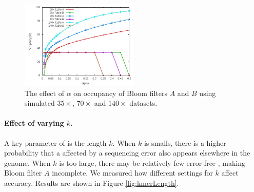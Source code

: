 \documentclass[10pt]{article}
\begin{document}

\begin{figure}[h!]
\begin{center}
\includegraphics[width=0.5\textwidth]{bloom_occupancy_alpha.jpg}
\caption{The effect of $\alpha$ on occupancy of Bloom filters $A$ and $B$ using simulated $35\times$, $70\times$ and $140\times$ datasets.\label{fig:bloom_occupancy_alpha}}
\end{center}
\end{figure}

\paragraph{Effect of varying $k$.}  
A key parameter of \tool is the \kmer length $k$.  When $k$ is smalls, there is a higher probability that a \kmer affected by a sequencing error also appears elsewhere in the genome.  When $k$ is too large, there may be relatively few error-free \kmers, making Bloom filter $A$ incomplete.  We measured how different settings for $k$ affect accuracy.  Results are shown in Figure \ref{fig:kmerLength}. 

\end{document}
